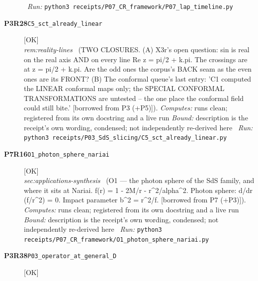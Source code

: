 \begin{description}
\ \emph{Run:} \texttt{python3 receipts/P07\_CR\_framework/P07\_lap\_timeline.py}
\item[\rcptlabel{C5_sct_already_linear}{P3R28}\textbf{P3R28}\quad\texttt{C5\_sct\_already\_linear}]\hfill\textsf{[OK]}\\
\textit{rem:reality-lines} \ (TWO CLOSURES. (A) X3r's open question: sin is real on the real axis AND on every line Re z = pi/2 + k.pi. The crossings are at z = pi/2 + k.pi. Are the odd ones the corpus's BACK seam as the even ones are its FRONT? (B) The conformal queue's last entry: 'C1 computed the LINEAR conformal maps only; the SPECIAL CONFORMAL TRANSFORMATIONS are untested -- the one place the conformal field could still bite.' [borrowed from P3 (+P5)]). 
\emph{Computes:} runs clean; registered from its own docstring and a live run
 \emph{Bound:} description is the receipt's own wording, condensed; not independently re-derived here
\ \emph{Run:} \texttt{python3 receipts/P03\_SdS\_slicing/C5\_sct\_already\_linear.py}
\item[\rcptlabel{O1_photon_sphere_nariai}{P7R16}\textbf{P7R16}\quad\texttt{O1\_photon\_sphere\_nariai}]\hfill\textsf{[OK]}\\
\textit{sec:applications-synthesis} \ (O1 --- the photon sphere of the SdS family, and where it sits at Nariai. f(r) = 1 - 2M/r - r\textasciicircum{}2/alpha\textasciicircum{}2. Photon sphere: d/dr (f/r\textasciicircum{}2) = 0. Impact parameter b\textasciicircum{}2 = r\textasciicircum{}2/f. [borrowed from P7 (+P3)]). 
\emph{Computes:} runs clean; registered from its own docstring and a live run
 \emph{Bound:} description is the receipt's own wording, condensed; not independently re-derived here
\ \emph{Run:} \texttt{python3 receipts/P07\_CR\_framework/O1\_photon\_sphere\_nariai.py}
\item[\rcptlabel{P03_operator_at_general_D}{P3R38}\textbf{P3R38}\quad\texttt{P03\_operator\_at\_general\_D}]\hfill\textsf{[OK]}\\

\end{description}
